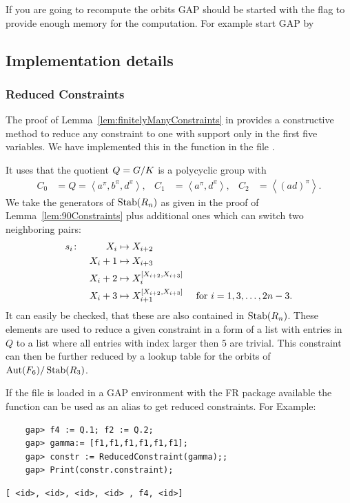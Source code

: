 \documentclass[a4paper,11pt]{amsart}
\begin{document}
If you are going to recompute the orbits GAP should be started with the  flag
to provide enough memory for the computation. For example start GAP by 


\subsection{Implementation details}
\label{sec:gap_details}
\subsubsection{Reduced Constraints}
The proof of Lemma~\ref{lem:finitelyManyConstraints} in \cite{Lysenok:QudraticEquationsInGrig} 
provides a constructive method to reduce any constraint to one with support
only in the first five variables. 
We have implemented this in the function  in the file
.

It uses that the quotient $Q={G/K}$ is a polycyclic group with 
\begin{align*}
 C_0 &= Q = \left<a^\pi,b^\pi,d^\pi\right>, &
 C_1 &= \left<a^\pi,d^\pi\right>, &
 C_2 &= \left<(ad)^\pi\right>.
\end{align*}
We take the generators of $\operatorname{Stab}(R_n)$ as given in the proof of Lemma~\ref{lem:90Constraints}
plus additional ones which can switch two neighboring pairs:
\begin{align*}
 s_i &\colon &X_i&\mapsto X_{i+2}&\\
	    &&X_i+1&\mapsto X_{i+3}&\\
	    &&X_i+2&\mapsto X_{i}^{[X_{i+2},X_{i+3}]}&\\
	    &&X_i+3&\mapsto X_{i+1}^{[X_{i+2},X_{i+3}]} & \textup{ for }i = 1,3,\ldots,2n-3.
\end{align*}
It can easily be checked, that these are also contained in $\operatorname{Stab}(R_n)$. These elements
are used to reduce a given constraint in a form of a list with entries in $Q$ to a
list where all entries with index larger then $5$ are trivial. 
This constraint can then be further reduced by a lookup table for the orbits
of ${\operatorname{{Aut}}(F_6)/\operatorname{Stab}(R_3)}$. 

If the file  is loaded in a GAP environment with the FR package available 
the function  can be used as an alias to get 
reduced constraints. For Example:
 \begin{lstlisting}
    gap> f4 := Q.1; f2 := Q.2;
    gap> gamma:= [f1,f1,f1,f1,f1,f1];
    gap> constr := ReducedConstraint(gamma);;
    gap> Print(constr.constraint);
\end{lstlisting} 
\begin{verbatim}
[ <id>, <id>, <id>, <id> , f4, <id>]
\end{verbatim} 
\end{document}
